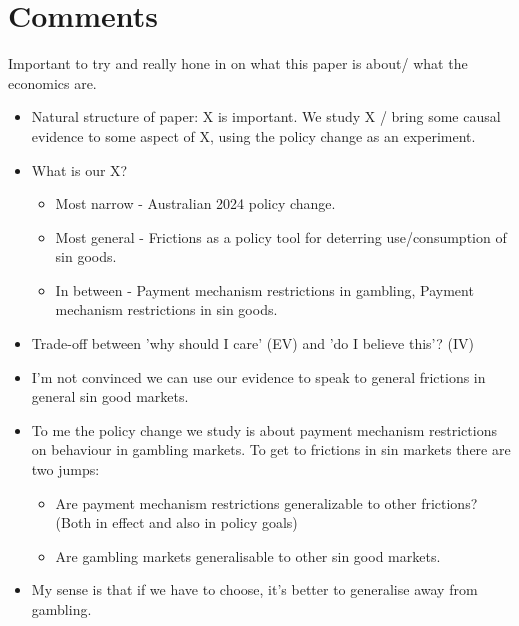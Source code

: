 \documentclass[11pt]{article}
\begin{document}
\newpage



\newpage
\appendix 
\section{Comments}
Important to try and really hone in on what this paper is about/ what the economics are. 
\begin{itemize}
    \item Natural structure of paper: X is important. We study X / bring some causal evidence to some aspect of X, using the policy change as an experiment.
    \item What is our X?
        \begin{itemize}
            \item Most narrow - Australian 2024 policy change.
            \item Most general - Frictions as a policy tool for deterring use/consumption of sin goods.
            \item In between - Payment mechanism restrictions in gambling, Payment mechanism restrictions in sin goods. 
        \end{itemize}
    \item Trade-off between 'why should I care' (EV) and 'do I believe this'? (IV)
    \item I'm not convinced we can use our evidence to speak to general frictions in general sin good markets. 
    \item To me the policy change we study is about payment mechanism restrictions on behaviour in gambling markets. To get to frictions in sin markets there are two jumps:
        \begin{itemize}
            \item Are payment mechanism restrictions generalizable to other frictions? (Both in effect and also in policy goals)
            \item Are gambling markets generalisable to other sin good markets. 
        \end{itemize}
    \item My sense is that if we have to choose, it's better to generalise away from gambling.
\end{itemize}
\end{document}

